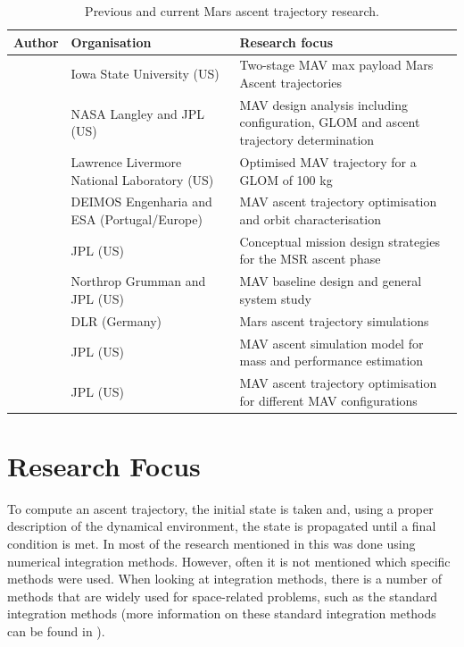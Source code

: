 \begin{table}[H]
\begin{center}
\caption{Previous and current Mars ascent trajectory research.}
\label{tab:referenceResearch}
\begin{tabularx}{1.0\textwidth}{|X|X|X|}
\hline 
\textbf{Author} 	& \textbf{Organisation} & \textbf{Research focus} \\ \hline \hline
\cite{fanning1996model} & Iowa State University (US) & Two-stage \ac{MAV} max payload Mars Ascent trajectories \\ \hline
\cite{desai1998}& \ac{NASA} Langley and \ac{JPL} (US) & \ac{MAV} design analysis including configuration, \ac{GLOM} and ascent trajectory determination \\ \hline
\cite{whitehead2004mars,whitehead2005} & Lawrence Livermore National Laboratory (US)& Optimised \ac{MAV} trajectory for a \ac{GLOM} of 100 kg \\ \hline
 \cite{di2007system} & DEIMOS Engenharia and \acs{ESA} (Portugal/Europe) & \ac{MAV} ascent trajectory optimisation and orbit characterisation \\ \hline
\cite{woolley2011mars} & \ac{JPL} (US) & Conceptual mission design strategies for the \ac{MSR} ascent phase \\ \hline
\cite{trinidad2012} & Northrop Grumman and \ac{JPL} (US) & \ac{MAV} baseline design and general system study  \\ \hline
\cite{dumont2015design} & \ac{DLR} (Germany)		& Mars ascent trajectory simulations \\ \hline
\cite{woolley2015simple}  & \ac{JPL} (US) & \ac{MAV} ascent simulation model for mass and performance estimation \\ \hline
\cite{benito2016trajectory}  & \ac{JPL} (US) & \ac{MAV} ascent trajectory optimisation for different \ac{MAV} configurations \\ \hline

\end{tabularx}
\end{center}
\end{table}






\section{Research Focus}
\label{sec:researchFocus}
To compute an ascent trajectory, the initial state is taken and, using a proper description of the dynamical environment, the state is propagated until a final condition is met. In most of the research mentioned in  this was done using numerical integration methods. However, often it is not mentioned which specific methods were used. When looking at integration methods, there is a number of methods that are widely used for space-related problems, such as the standard integration methods (more information on these standard integration methods can be found in ). 

